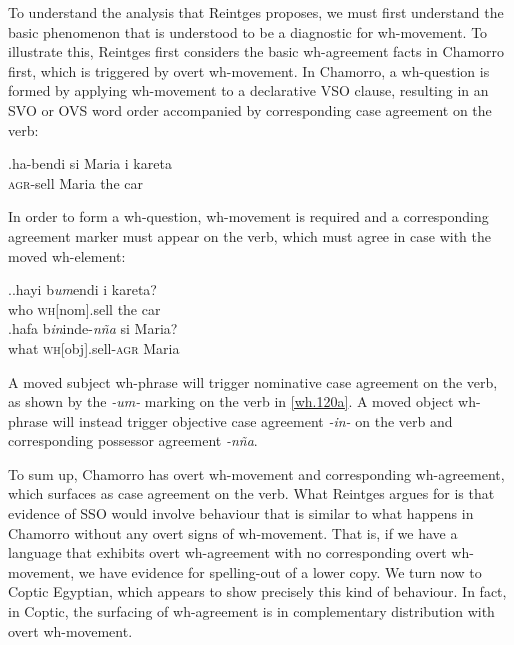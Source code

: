 \documentclass{glossa}
\begin{document}
To understand the analysis that Reintges proposes, we must first understand the basic phenomenon that is understood to be a diagnostic for wh-movement. To illustrate this, Reintges first considers the basic wh-agreement facts in Chamorro first, which is triggered by overt wh-movement. In Chamorro, a wh-question is formed by applying wh-movement to a declarative VSO clause, resulting in an SVO or OVS word order accompanied by corresponding case agreement on the verb:

\exg.\label{wh.110}ha-bendi si Maria i kareta\\
   \textsc{agr}-sell {} Maria the car\\

In order to form a wh-question, wh-movement is required and a corresponding agreement marker must appear on the verb, which must agree in case with the moved wh-element:

\ex.\ag.\label{wh.120a}hayi b\textit{um}endi i kareta?\\
   who \textsc{wh}[nom].sell the car\\
   \bg.\label{wh.120b}hafa b\textit{in}inde-\textit{n\~na} si Maria?\\
   what \textsc{wh}[obj].sell-\textsc{agr} {} Maria\\

A moved subject wh-phrase will trigger nominative case agreement on the verb, as shown by the \textit{-um-} marking on the verb in \ref{wh.120a}. A moved object wh-phrase will instead trigger objective case agreement \textit{-in-} on the verb and corresponding possessor agreement \textit{-n\~na}.

%

To sum up, Chamorro has overt wh-movement and corresponding wh-agreement, which surfaces as case agreement on the verb. What Reintges argues for is that evidence of SSO would involve behaviour that is similar to what happens in Chamorro without any overt signs of wh-movement. That is, if we have a language that exhibits overt wh-agreement with no corresponding overt wh-movement, we have evidence for spelling-out of a lower copy. We turn now to Coptic Egyptian, which appears to show precisely this kind of behaviour. In fact, in Coptic, the surfacing of wh-agreement is in complementary distribution with overt wh-movement.
\end{document}
